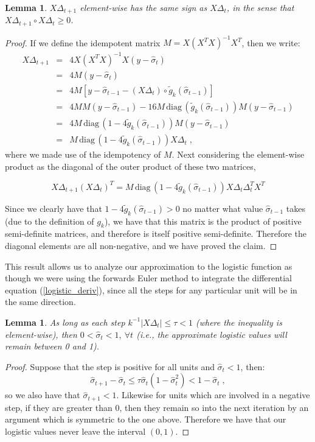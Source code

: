 \documentclass[11pt]{article}
\newtheorem{lem}[thm]{Lemma}
\begin{document}
\begin{lem}
$X\Delta_{t+1}$ element-wise has the same sign as $X\Delta_t$, in the sense that $X\Delta_{t+1}\circ X\Delta_t \geq 0$.
\end{lem}
\begin{proof}
If we define the idempotent matrix $M=X(X^TX)^{-1}X^T$, then we write:
\begin{eqnarray}
X\Delta_{t+1} &=& 4X(X^TX)^{-1}X(y-\hat{\sigma}_t) \nonumber \\
              &=& 4M(y-\hat{\sigma}_t)  \nonumber\\
              &=& 4M[y-\hat{\sigma}_{t-1}-(X\Delta_{t})\circ \tilde{g}_k(\hat{\sigma}_{t-1})]  \nonumber\\
&=& 4MM(y-\hat{\sigma}_{t-1})-16M\, \text{diag}\, (\tilde{g}_k(\hat{\sigma}_{t-1}))  M(y-\hat{\sigma}_{t-1})  \nonumber\\
              &=& 4M\,\text{diag}\,(1-4\tilde{g}_k(\hat{\sigma}_{t-1}))M(y-\hat{\sigma}_{t-1})  \nonumber\\
              &=& M\,\text{diag}\,(1-4\tilde{g}_k(\hat{\sigma}_{t-1}))X\Delta_t  \; ,
\label{stepsize_rel}
\end{eqnarray}
where we made use of the idempotency of $M$.  Next considering the element-wise product as the diagonal of the outer product of these two matrices,

$$X\Delta_{t+1}(X\Delta_{t})^T = M\,\text{diag}\,(1-4\tilde{g}_k(\hat{\sigma}_{t-1}))X\Delta_t \Delta_t^TX^T$$

Since we clearly have that $1-4\tilde{g}_k(\hat{\sigma}_{t-1}) > 0$ no matter what value $\hat{\sigma}_{t-1}$ takes (due to the definition of $g_k$), we have that this matrix is the product of positive semi-definite matrices, and therefore is itself positive semi-definite.  Therefore the diagonal elements are all non-negative, and we have proved the claim.
\end{proof}

This result allows us to analyze our approximation to the logistic function as though we were using the forwards Euler method to integrate the differential equation (\ref{logistic_deriv}), since all the steps for any particular unit will be in the same direction.

\begin{lem}
As long as each step $k^{-1}|X\Delta_t| \leq  \tau < 1$ (where the inequality is element-wise), then $0 < \hat{\sigma}_t < 1,\ \forall t$ (i.e., the approximate logistic values will remain between 0 and 1).
\end{lem}
\begin{proof}
Suppose that the step is positive for all units and $\hat{\sigma}_t < 1$, then:
$$\hat{\sigma}_{t+1}-\hat{\sigma}_t \leq \tau\hat{\sigma}_t(1-\hat{\sigma}_t^2) < 1-\hat{\sigma}_t \; ,$$
so we also have that  $\hat{\sigma}_{t+1} < 1$.  Likewise for units which are involved in a negative step, if they are greater than 0, then they remain so into the next iteration by an argument which is symmetric to the one above.  Therefore we have that our logistic values never leave the interval $(0,1)$.
\end{proof}
\end{document}
